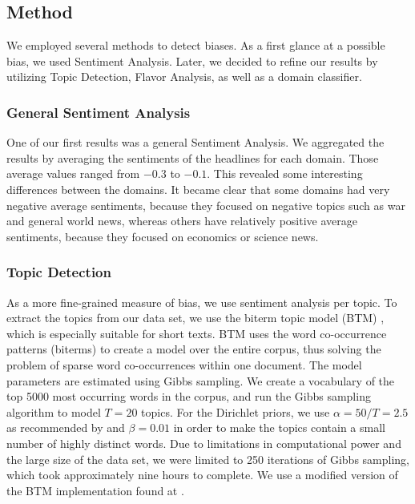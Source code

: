 \documentclass[final]{ieee}
\begin{document}
\subsection{Method}\label{sec:method}


We employed several methods to detect biases. As a first glance at a possible bias, we used Sentiment Analysis. Later, we decided to refine our results by utilizing Topic Detection, Flavor Analysis, as well as a domain classifier.

\subsubsection{General Sentiment Analysis}

One of our first results was a general Sentiment Analysis. %
We aggregated the results by averaging the sentiments of the headlines for each domain. Those average values ranged from $-0.3$ to $-0.1$. %
This revealed some interesting differences between the domains. It became clear that some domains had very negative average sentiments, because they focused on negative topics such as war and general world news, whereas others have relatively positive average sentiments, because they focused on economics or science news. %

\subsubsection{Topic Detection}

As a more fine-grained measure of bias, we use sentiment analysis per topic. To extract the topics from our data set, we use the biterm topic model (BTM) \cite{BTM13}, which is especially suitable for short texts. BTM uses the word co-occurrence patterns (biterms) to create a model over the entire corpus, thus solving the problem of sparse word co-occurrences within one document. The model parameters are estimated using Gibbs sampling. We create a vocabulary of the top 5000 most occurring words in the corpus, and run the Gibbs sampling algorithm to model $T = 20$ topics. For the Dirichlet priors, we use $\alpha = 50/T = 2.5$ as recommended by \cite{FST13} and $\beta = 0.01$ in order to make the topics contain a small number of highly distinct words. Due to limitations in computational power and the large size of the data set, we were limited to 250 iterations of Gibbs sampling, which took approximately nine hours to complete. We use a modified version of the BTM implementation found at \cite{BTM15}.
\end{document}
